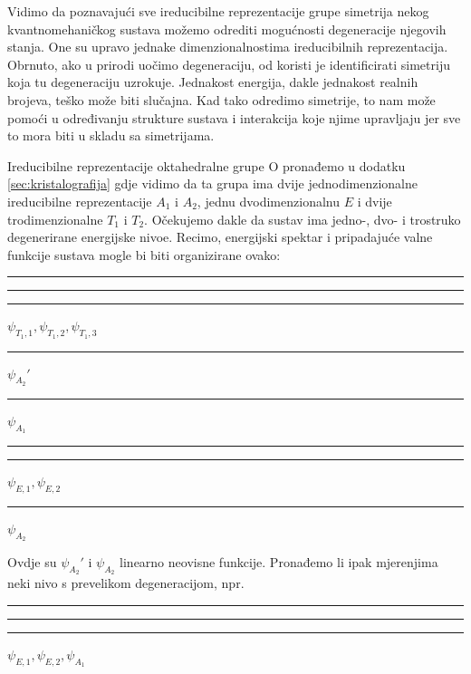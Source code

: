 Vidimo da poznavajući sve ireducibilne reprezentacije grupe simetrija nekog
kvantnomehaničkog
sustava možemo odrediti mogućnosti degeneracije njegovih stanja.
One su upravo jednake dimenzionalnostima ireducibilnih reprezentacija.
Obrnuto, ako u prirodi uočimo degeneraciju, od koristi je identificirati
simetriju koja tu degeneraciju uzrokuje. Jednakost energija, dakle jednakost
realnih brojeva, teško može biti slučajna. Kad tako odredimo simetrije,
to nam može pomoći u određivanju strukture sustava i interakcija koje
njime upravljaju jer sve to mora biti u skladu sa simetrijama.

\begin{primjer}
Ireducibilne reprezentacije oktahedralne grupe O pronađemo
u dodatku \ref{sec:kristalografija} gdje vidimo 
da ta grupa ima dvije jednodimenzionalne
ireducibilne reprezentacije $A_1$ i $A_2$, jednu
dvodimenzionalnu $E$ i dvije trodimenzionalne $T_1$ i  $T_2$.
Očekujemo dakle da sustav ima jedno-, dvo- i trostruko degenerirane
energijske nivoe.
Recimo, energijski spektar i pripadajuće valne funkcije sustava mogle
bi biti organizirane ovako:

\hspace*{2cm}
\rule{3cm}{1pt}\hspace*{-3cm}%
\rule[2pt]{3cm}{1pt}\hspace*{-3cm}%
\rule[4pt]{3cm}{1pt}\hspace{12pt}%
$\psi_{T_1,1}, \psi_{T_1,2}, \psi_{T_1,3}$

\hspace*{2cm}
\rule{3cm}{1pt}\hspace*{12pt}%
$\psi_{A_2}'$

\hspace*{2cm}
\rule{3cm}{1pt}\hspace*{12pt}%
$\psi_{A_1}$

\hspace*{2cm}
\rule{3cm}{1pt}\hspace*{-3cm}%
\rule[2pt]{3cm}{1pt}\hspace*{12pt}%
$\psi_{E,1}, \psi_{E,2}$

\hspace*{2cm}
\rule{3cm}{1pt}\hspace*{12pt}%
$\psi_{A_2}$

Ovdje su $\psi_{A_2}'$ i $\psi_{A_2}$ linearno neovisne funkcije.
Pronađemo li ipak mjerenjima neki nivo s prevelikom degeneracijom,
npr.

\hspace*{2cm}
\rule{3cm}{1pt}\hspace*{-3cm}%
\rule[2pt]{3cm}{1pt}\hspace*{-3cm}%
\rule[4pt]{3cm}{1pt}\hspace{12pt}%
$\psi_{E,1}, \psi_{E,2}, \psi_{A_1}$


\end{primjer}
